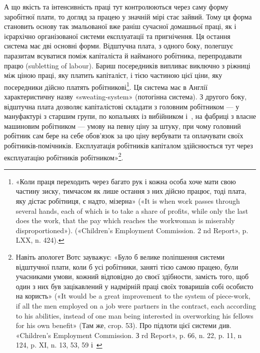 А що якість та інтенсивність праці тут контролюються через
саму форму заробітної плати, то догляд за працею у значній мірі
стає зайвий. Тому ця форма становить основу так змальованої
вже раніш сучасної домашньої праці, як і ієрархічно організованої
системи експлуатації та пригнічення. Ця остання система
має дві основні форми. Відштучна плата, з одного боку, полегшує
паразитам всуватися поміж капіталіста й найманого робітника,
перепродавати працю (subletting of labour). Бариш посередників
випливає виключно з ріжниці між ціною праці, яку платить
капіталіст, і тією частиною цієї ціни, яку посередники дійсно
платять робітникові\footnote{
«Коли праця переходить через багато рук і кожна особа хоче
мати свою частину зиску, тимчасом як лише остання з них дійсно працює,
тоді плата, яку дістає робітниця, є надто, мізерна» («It is when work
passes through several hands, each of which is to take a share of profits,
while only the last does the work, that the pay which reaches the workwoman
is miserably disproportioned»). («Children’s Employment Commission.
2 nd Report», p. LXX, n. 424).
}. Ця система має в Англії характеристичну
назву «sweating-system» (потогінна система). З другого боку,
відштучна плата дозволяє капіталістові складати з головним робітником
— у мануфактурі з старшим групи, по копальнях із
вибійником і~, на фабриці з власне машиновим робітником —
умову на певну ціну за штуку, при чому головний робітник сам
бере на себе обов’язок за цю ціну вербувати та оплачувати своїх
робітників-помічників. Експлуатація робітників капіталом здійснюється
тут через експлуатацію робітників робітником»\footnote{
Навіть апологет Вотс зауважує: «Було б велике поліпшення
системи відштучної плати, коли б усі робітники, заняті тією самою працею,
були учасниками умови, кожний відповідно до своєї здібности, замість
того, щоб один з них був зацікавлений у надмірній праці своїх
товаришів собі особисто на користь» («It would be a great improvement
to the system of piece-work, if all the men employed on a job were partners
in the contract, each according to his abilities, instead of one man
being interested in overworking his fellows for his own benefit» (Там же,
crop. 53). Про підлоти цієї системи див. «Children’s Employment Commission.
З rd Report», p. 66, n. 22, p. 11, n 124, p. XI, n. 13, 53, 59 і~
}.

